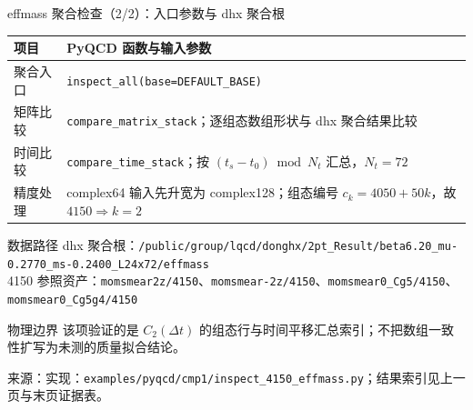 \documentclass[UTF8,aspectratio=169,11pt]{ctexbeamer}
\newcommand{\source}[1]{\vspace{0.05em}\par{\raggedright\scriptsize\color{muted}来源：#1\par}}
\newcommand{\codepath}[1]{\nolinkurl{#1}}
\begin{document}
\begin{frame}[t]{effmass 聚合检查（2/2）：入口参数与 dhx 聚合根}
  \small
  \begin{tabularx}{0.96\textwidth}{@{}P{0.22\textwidth}Y@{}}
    \toprule
    项目 & PyQCD 函数与输入参数 \\
    \midrule
    聚合入口 & \codepath{inspect_all(base=DEFAULT_BASE)} \\
    矩阵比较 & \codepath{compare_matrix_stack}；逐组态数组形状与 dhx 聚合结果比较 \\
    时间比较 & \codepath{compare_time_stack}；按 $(t_s-t_0)\bmod N_t$ 汇总，$N_t=72$ \\
    精度处理 & complex64 输入先升宽为 complex128；组态编号 $c_k=4050+50k$，故 $4150\Rightarrow k=2$ \\
    \bottomrule
  \end{tabularx}
  \vspace{0.20em}
  \begin{block}{数据路径}
    \scriptsize
    dhx 聚合根：\codepath{/public/group/lqcd/donghx/2pt_Result/beta6.20_mu-0.2770_ms-0.2400_L24x72/effmass}\\
    4150 参照资产：\codepath{momsmear2z/4150}、\codepath{momsmear-2z/4150}、\codepath{momsmear0_Cg5/4150}、\codepath{momsmear0_Cg5g4/4150}
  \end{block}
  \begin{block}{物理边界}
    \scriptsize
    该项验证的是 $C_2(\Delta t)$ 的组态行与时间平移汇总索引；不把数组一致性扩写为未测的质量拟合结论。
  \end{block}
  \source{实现：\codepath{examples/pyqcd/cmp1/inspect_4150_effmass.py}；结果索引见上一页与末页证据表。}
\end{frame}
\end{document}
